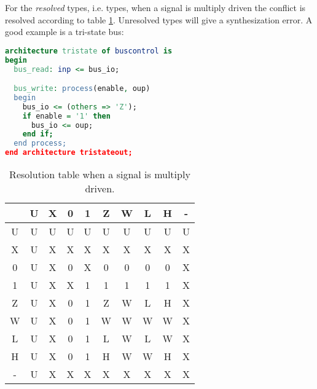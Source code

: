 For the \emph{resolved} types, i.e.  types, when a signal is
multiply driven the conflict is resolved according to table
\ref{tab:std-logic-1164-resolve}.  Unresolved types will give a synthesization
error.  A good example is a tri-state bus: 
\begin{lstlisting}[language=vhdl]
architecture tristate of buscontrol is
begin
  bus_read: inp <= bus_io;

  bus_write: process(enable, oup)
  begin
    bus_io <= (others => 'Z');
    if enable = '1' then
      bus_io <= oup;
    end if;
  end process;
end architecture tristateout;
\end{lstlisting}
\begin{table}[h]
  \centering
  {
    \ttfamily
    \begin{tabular}{c|ccccccccc} 
      \toprule
      & U & X & 0 & 1 & Z & W & L & H & - \\
      \midrule
      U & U & U & U & U & U & U & U & U & U \\
      X & U & X & X & X & X & X & X & X & X \\
      0 & U & X & 0 & X & 0 & 0 & 0 & 0 & X \\
      1 & U & X & X & 1 & 1 & 1 & 1 & 1 & X \\
      Z & U & X & 0 & 1 & Z & W & L & H & X \\
      W & U & X & 0 & 1 & W & W & W & W & X \\
      L & U & X & 0 & 1 & L & W & L & W & X \\
      H & U & X & 0 & 1 & H & W & W & H & X \\
      - & U & X & X & X & X & X & X & X & X \\
      \bottomrule
    \end{tabular}
  }
  \caption{
    Resolution table when a  signal is multiply driven.
    \label{tab:std-logic-1164-resolve}
  }
\end{table}

